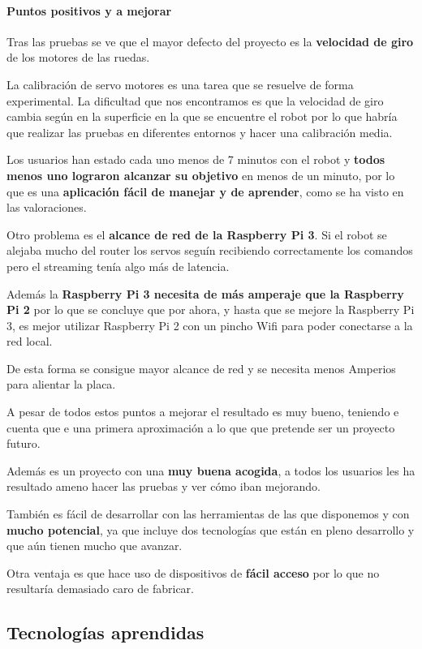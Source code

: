 \documentclass[twoside, 12pt]{epstfg}
\begin{document}
\paragraph{Puntos positivos y a mejorar}

Tras las pruebas se ve que el mayor defecto del proyecto es la \textbf{velocidad de giro} de los motores de las ruedas.

La calibración de servo motores es una tarea que se resuelve de forma experimental. La dificultad que nos encontramos es que la velocidad de giro cambia según en la superficie en la que se encuentre el robot por lo que habría que realizar las pruebas en diferentes entornos y hacer una calibración media.

Los usuarios han estado cada uno menos de 7 minutos con el robot y \textbf{todos menos uno lograron alcanzar su objetivo} en menos de un minuto, por lo que es una \textbf{aplicación fácil de manejar y de aprender}, como se ha visto en las valoraciones.

Otro problema es el \textbf{alcance de red de la Raspberry Pi 3}. Si el robot se alejaba mucho del router los servos seguín recibiendo correctamente los comandos pero el streaming tenía algo más de latencia.

Además la \textbf{Raspberry Pi 3 necesita de más amperaje que la Raspberry Pi 2} por lo que se concluye que por ahora, y hasta que se mejore la Raspberry Pi 3, es mejor utilizar Raspberry Pi 2 con un pincho Wifi para poder conectarse a la red local.

De esta forma se consigue mayor alcance de red y se necesita menos Amperios para alientar la placa.

A pesar de todos estos puntos a mejorar el resultado es muy bueno, teniendo e cuenta que e una primera aproximación a lo que que pretende ser un proyecto futuro.

Además es un proyecto con una \textbf{muy buena acogida}, a todos los usuarios les ha resultado ameno hacer las pruebas y ver cómo iban mejorando.

También es fácil de desarrollar con las herramientas de las que disponemos y con \textbf{mucho potencial}, ya que incluye dos tecnologías que están en pleno desarrollo y que aún tienen mucho que avanzar.

Otra ventaja es que hace uso de dispositivos de \textbf{fácil acceso} por lo que no resultaría demasiado caro de fabricar.

\subsection{Tecnologías aprendidas}
\end{document}
